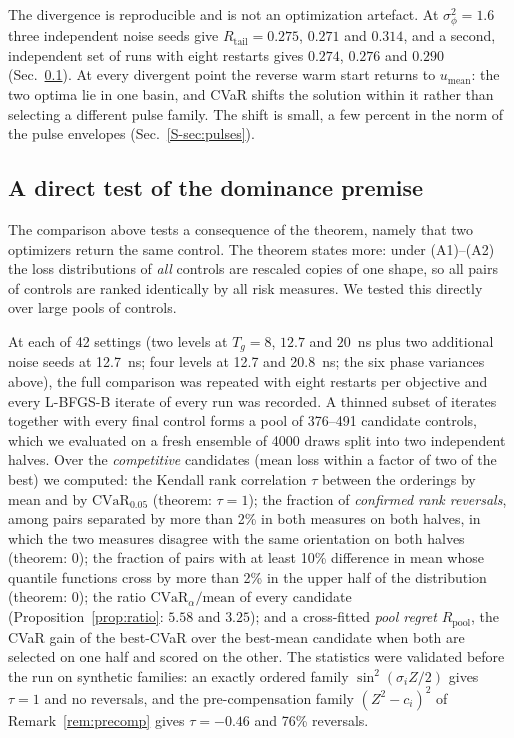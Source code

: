 \documentclass[aps,pra,twocolumn,superscriptaddress,reprint,nofootinbib,floatfix]{revtex4-2}
\theoremstyle{definition}
\newcommand{\cvar}{\mathrm{CVaR}}
\newcommand{\Rt}{R_{\mathrm{tail}}}
\newcommand{\umean}{u_{\mathrm{mean}}}
\newcommand{\sref}[1]{Sec.~\ref{S-#1}}
\begin{document}
The divergence is reproducible and is not an optimization artefact. At
$\sigma_\phi^2=1.6$ three independent noise seeds give
$\Rt=0.275$, $0.271$ and $0.314$, and a second, independent set of runs with
eight restarts gives $0.274$, $0.276$ and $0.290$ (Sec.~\ref{sec:dominance}).
At every divergent point the reverse warm start returns to $\umean$: the two
optima lie in one basin, and CVaR shifts the solution within it rather than
selecting a different pulse family. The shift is small, a few percent in the
norm of the pulse envelopes (\sref{sec:pulses}).

\subsection{A direct test of the dominance premise}
\label{sec:dominance}

The comparison above tests a consequence of the theorem, namely that two
optimizers return the same control. The theorem states more: under
(A1)--(A2) the loss distributions of \emph{all} controls are rescaled copies
of one shape, so all pairs of controls are ranked identically by all risk
measures. We tested this directly over large pools of controls.

At each of 42 settings (two levels at $T_g=8$, $12.7$ and $20$~ns plus two
additional noise seeds at 12.7~ns; four levels at 12.7 and 20.8~ns; the six
phase variances above), the full comparison was repeated with eight restarts
per objective and every L-BFGS-B iterate of every run was recorded. A thinned
subset of iterates together with every final control forms a pool of
376--491 candidate controls, which we evaluated on a fresh ensemble of 4000
draws split into two independent halves. Over the \emph{competitive}
candidates (mean loss within a factor of two of the best) we computed: the
Kendall rank correlation $\tau$ between the orderings by mean and by
$\cvar_{0.05}$ (theorem: $\tau=1$); the fraction of \emph{confirmed rank
reversals}, among pairs separated by more than 2\% in both measures on both
halves, in which the two measures disagree with the same orientation on both
halves (theorem: 0); the fraction of pairs with at least 10\% difference in
mean whose quantile functions cross by more than 2\% in the upper half of the
distribution (theorem: 0); the ratio $\cvar_\alpha/\text{mean}$ of every
candidate (Proposition~\ref{prop:ratio}: $5.58$ and $3.25$); and a
cross-fitted \emph{pool regret} $R_{\mathrm{pool}}$, the CVaR gain of the
best-CVaR over the best-mean candidate when both are selected on one half and
scored on the other. The statistics were validated before the run on
synthetic families: an exactly ordered family $\sin^2(\sigma_iZ/2)$ gives
$\tau=1$ and no reversals, and the pre-compensation family $(Z^2-c_i)^2$ of
Remark~\ref{rem:precomp} gives $\tau=-0.46$ and 76\% reversals.
\end{document}
